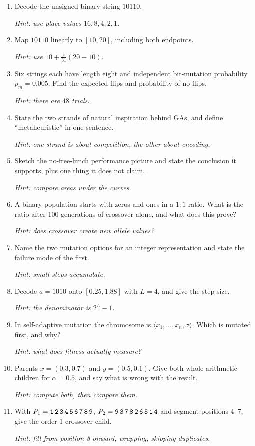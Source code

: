 \documentclass[11pt,a4paper]{article}
\begin{document}
\begin{enumerate}[label=\textbf{D\arabic*.}]
\item Decode the unsigned binary string $10110$.\par\emph{Hint: use place values $16,8,4,2,1$.}
\item Map $10110$ linearly to $[10,20]$, including both endpoints.\par\emph{Hint: use $10+\frac{z}{31}(20-10)$.}
\item Six strings each have length eight and independent bit-mutation probability $p_m=0.005$. Find the expected flips and probability of no flips.\par\emph{Hint: there are $48$ trials.}
\item State the two strands of natural inspiration behind GAs, and define
``metaheuristic'' in one sentence.\par\emph{Hint: one strand is about competition, the other about encoding.}
\item Sketch the no-free-lunch performance picture and state the conclusion it
supports, plus one thing it does not claim.\par\emph{Hint: compare areas under the curves.}
\item A binary population starts with zeros and ones in a $1{:}1$ ratio. What
is the ratio after 100 generations of crossover alone, and what does this
prove?\par\emph{Hint: does crossover create new allele values?}
\item Name the two mutation options for an integer representation and state
the failure mode of the first.\par\emph{Hint: small steps accumulate.}
\item Decode $a=1010$ onto $[0.25,1.88]$ with $L=4$, and give the step
size.\par\emph{Hint: the denominator is $2^L-1$.}
\item In self-adaptive mutation the chromosome is
$\langle x_1,\ldots,x_n,\sigma\rangle$. Which is mutated first, and why?\par\emph{Hint: what does fitness actually measure?}
\item Parents $x=(0.3,0.7)$ and $y=(0.5,0.1)$. Give both whole-arithmetic
children for $\alpha=0.5$, and say what is wrong with the result.\par\emph{Hint: compute both, then compare them.}
\item With $P_1=\texttt{1\,2\,3\,4\,5\,6\,7\,8\,9}$,
$P_2=\texttt{9\,3\,7\,8\,2\,6\,5\,1\,4}$ and segment positions 4--7, give the
order-1 crossover child.\par\emph{Hint: fill from position 8 onward, wrapping, skipping duplicates.}
\end{enumerate}
\end{document}
